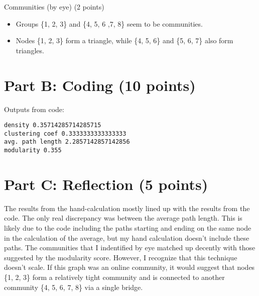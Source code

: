 \documentclass{article}
\begin{document}
\begin{enumerate}
{{            \item {
                Communities (by eye) (2 points)

                \begin{itemize}
                    \item Groups \{1, 2, 3\} and \{4, 5, 6 ,7, 8\} seem to be communities.
                    \item {
                        Nodes \{1, 2, 3\} form a triangle, while \{4, 5, 6\} 
                        and \{5, 6, 7\} also form triangles.
                    }
                \end{itemize}

            }
        }
    }
\end{enumerate}

\section*{Part B: Coding (10 points)}



Outputs from code:
\begin{verbatim}
density 0.35714285714285715
clustering coef 0.3333333333333333
avg. path length 2.2857142857142856
modularity 0.355

\end{verbatim}

\section*{Part C: Reflection (5 points)}

The results from the hand-calculation mostly lined up with the results from the 
code. The only real discrepancy was between the average path length. This is likely
due to the code including the paths starting and ending on the same node in the 
calculation of the average, but my hand calculation doesn't include these paths.
The communities that I indentified by eye matched up decently with those suggested 
by the modularity score. However, I recognize that this technique doesn't scale. 
If this graph was an online community, it would suggest that nodes \{1, 2, 3\} 
form a relatively tight community and is connected to another community \{4, 5, 6, 7, 8\} 
via a single bridge.
\end{document}
